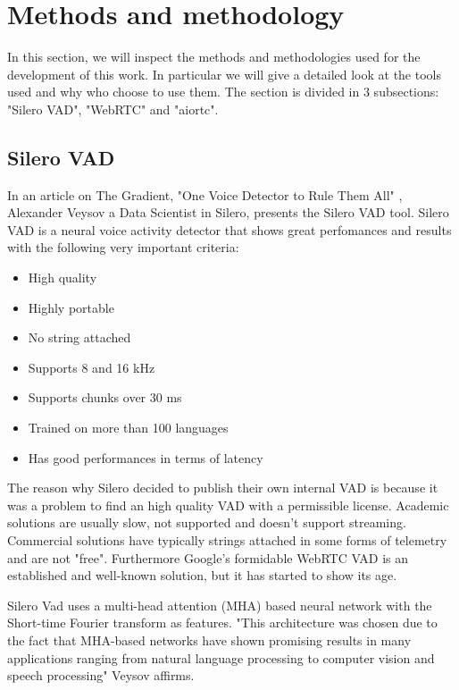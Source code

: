 \documentclass[../main.tex]{subfiles}
\begin{document}
\section{Methods and methodology}
\label{methods and methodology}

In this section, we will inspect the methods and methodologies used for the development of this work. In particular we will give a detailed look at the tools used and why who choose to use them. The section is divided in 3 subsections: "Silero VAD", "WebRTC" and "aiortc". 

\subsection{Silero VAD}

In an article on The Gradient, "One Voice Detector to Rule Them All" \cite{veysov20202onevoice}, Alexander Veysov a Data Scientist in Silero, presents the Silero VAD tool. Silero VAD is a neural voice activity detector that shows great perfomances and results with the following very important criteria:

\begin{itemize}
    \item High quality
    \item Highly portable
    \item No string attached
    \item Supports 8 and 16 kHz
    \item Supports chunks over 30 ms
    \item Trained on more than 100 languages 
    \item Has good performances in terms of latency
\end{itemize}

The reason why Silero decided to publish their own internal VAD is because it was a problem to find an high quality VAD with a permissible license. Academic solutions are usually slow, not supported and doesn't support streaming. Commercial solutions have typically strings attached in some forms of telemetry and are not "free". Furthermore Google’s formidable WebRTC VAD is an established and well-known solution, but it has started to show its age. 

Silero Vad uses a multi-head attention (MHA) based neural network with the Short-time Fourier transform as features. "This architecture was chosen due to the fact that MHA-based networks have shown promising results in many applications ranging from natural language processing to computer vision and speech processing" Veysov affirms. 
\end{document}
